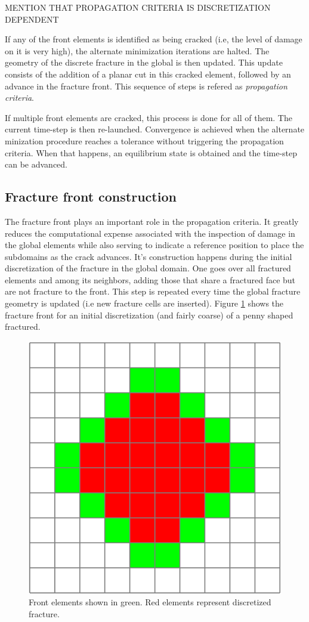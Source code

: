 MENTION THAT PROPAGATION CRITERIA IS DISCRETIZATION DEPENDENT

If any of the front elements is identified as being cracked (i.e, the level of damage on it is very high), the alternate minimization iterations are halted. The geometry of the discrete fracture in the global is then updated. This update consists of the addition of a planar cut in this cracked element, followed by an advance in the fracture front. This sequence of steps is refered as \textit{propagation criteria}.

If multiple front elements are cracked, this process is done for all of them. The current time-step is then re-launched. Convergence is achieved when the alternate minization procedure reaches a tolerance without triggering the propagation criteria. When that happens, an equilibrium state is obtained and the time-step can be advanced.

\subsection{Fracture front construction}

The fracture front plays an important role in the propagation criteria. It greatly reduces the computational expense associated with the inspection of damage in the global elements while also serving to indicate a reference position to place the subdomains as the crack advances. It's construction happens during the initial discretization of the fracture in the global domain. One goes over all fractured elements and among its neighbors, adding those that share a fractured face but are not fracture to the front. This step is repeated every time the global fracture geometry is updated (i.e new fracture cells are inserted). Figure \ref{fig:crack_front} shows the fracture front for an initial discretization (and fairly coarse) of a penny shaped fractured.

\begin{figure}[h]
    \centering
    \includegraphics[width=0.4\linewidth]{Chapter4/figures/front_penny.png}
    \caption{Front elements shown in green. Red elements represent discretized fracture.}
    \label{fig:crack_front}
\end{figure}

